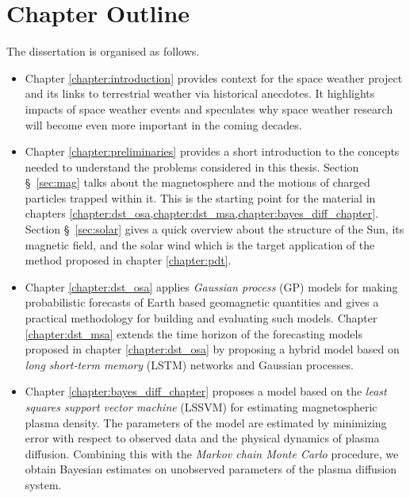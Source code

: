\section{Chapter Outline}

The dissertation is organised as follows.

\begin{itemize}
    \item Chapter \ref{chapter:introduction} provides context for the space weather project and its 
    links to terrestrial weather via historical anecdotes. It highlights impacts of space weather events 
    and speculates why space weather research will become even more important in the coming decades.

    \item Chapter \ref{chapter:preliminaries} provides a short introduction to the concepts needed to 
    understand the problems considered in this thesis. Section \S~\ref{sec:mag} talks about the magnetosphere and 
    the motions of charged particles trapped within it. This is the starting point for the material in chapters 
    \cref{chapter:dst_osa,chapter:dst_msa,chapter:bayes_diff_chapter}. Section \S~\ref{sec:solar} gives a 
    quick overview about the structure of the Sun, its magnetic field, and the solar wind which is the target 
    application of the method proposed in chapter \ref{chapter:pdt}.
    
    \item Chapter \ref{chapter:dst_osa} applies \emph{Gaussian process} (GP) models for making probabilistic 
    forecasts of Earth based geomagnetic quantities and gives a practical methodology for building and evaluating 
    such models. Chapter \ref{chapter:dst_msa} extends the time horizon of the forecasting models proposed in 
    chapter \ref{chapter:dst_osa} by proposing a hybrid model based on \emph{long short-term memory} (LSTM) networks 
    and Gaussian processes.
    
    \item Chapter \ref{chapter:bayes_diff_chapter} proposes a model based on the 
    \emph{least squares support vector machine} (LSSVM) for estimating magnetospheric plasma density. The parameters 
    of the model are estimated by minimizing error with respect to observed data and the physical dynamics of 
    plasma diffusion. Combining this with the \emph{Markov chain Monte Carlo} procedure, we obtain Bayesian 
    estimates on unobserved parameters of the plasma diffusion system.   
    

\end{itemize}
